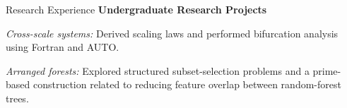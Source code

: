 \begin{rubric}{Research Experience}
\entry*[2020 -- 2024]%
  \textbf{Undergraduate Research Projects}
  \par \textit{Cross-scale systems:} Derived scaling laws and performed bifurcation analysis using Fortran and AUTO.
  \par \textit{Arranged forests:} Explored structured subset-selection problems and a prime-based construction related to reducing feature overlap between random-forest trees.


\end{rubric}
